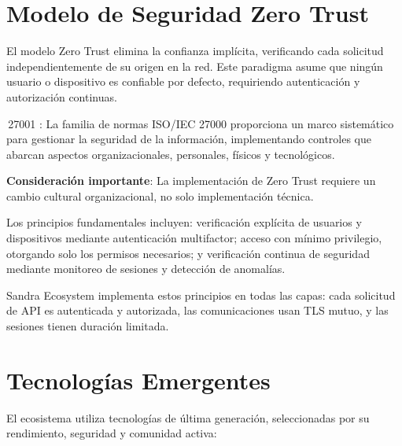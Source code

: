 \documentclass[11pt, spanish, letterpaper, twocolumn]{book}
\newcommand{\norma}[2]{%
    \tikz[baseline=(char.base)]{%
        \node[circle, fill=isoBlue, text=white, font=\bfseries\tiny, inner sep=1pt] (char) {#1};
    }\,#2%
}
\begin{document}
\section{Modelo de Seguridad Zero Trust}

El modelo Zero Trust elimina la confianza implícita, verificando cada solicitud independientemente de su origen en la red. Este paradigma asume que ningún usuario o dispositivo es confiable por defecto, requiriendo autenticación y autorización continuas.

\norma{ISO}{27001}: La familia de normas ISO/IEC 27000 proporciona un marco sistemático para gestionar la seguridad de la información, implementando controles que abarcan aspectos organizacionales, personales, físicos y tecnológicos.

\begin{cajaadvertencia}
    \textbf{Consideración importante}: La implementación de Zero Trust requiere un cambio cultural organizacional, no solo implementación técnica.
\end{cajaadvertencia}

Los principios fundamentales incluyen: verificación explícita de usuarios y dispositivos mediante autenticación multifactor; acceso con mínimo privilegio, otorgando solo los permisos necesarios; y verificación continua de seguridad mediante monitoreo de sesiones y detección de anomalías.

Sandra Ecosystem implementa estos principios en todas las capas: cada solicitud de API es autenticada y autorizada, las comunicaciones usan TLS mutuo, y las sesiones tienen duración limitada.

\section{Tecnologías Emergentes}

El ecosistema utiliza tecnologías de última generación, seleccionadas por su rendimiento, seguridad y comunidad activa:
\end{document}

